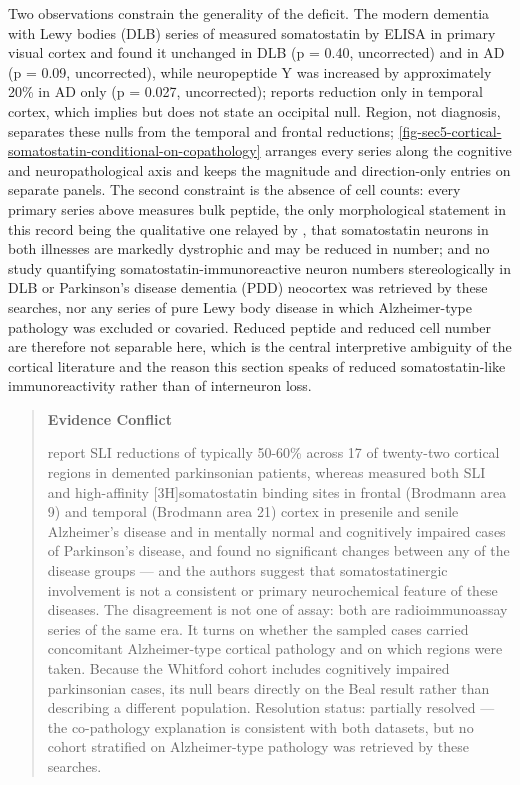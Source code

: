 \documentclass[11pt]{article}
\begin{document}
Two observations constrain the generality of the deficit. The modern dementia with Lewy bodies (DLB) series of \citet{Khundakar2016} measured somatostatin by ELISA in primary visual cortex and found it unchanged in DLB (p = 0.40, uncorrected) and in AD (p = 0.09, uncorrected), while neuropeptide Y was increased by approximately 20\% in AD only (p = 0.027, uncorrected); \citet{Leake1991} reports reduction only in temporal cortex, which implies but does not state an occipital null. Region, not diagnosis, separates these nulls from the temporal and frontal reductions; \ref{fig-sec5-cortical-somatostatin-conditional-on-copathology} arranges every series along the cognitive and neuropathological axis and keeps the magnitude and direction-only entries on separate panels. The second constraint is the absence of cell counts: every primary series above measures bulk peptide, the only morphological statement in this record being the qualitative one relayed by \citet{Beal1990}, that somatostatin neurons in both illnesses are markedly dystrophic and may be reduced in number; and no study quantifying somatostatin-immunoreactive neuron numbers stereologically in DLB or Parkinson's disease dementia (PDD) neocortex was retrieved by these searches, nor any series of pure Lewy body disease in which Alzheimer-type pathology was excluded or covaried. Reduced peptide and reduced cell number are therefore not separable here, which is the central interpretive ambiguity of the cortical literature and the reason this section speaks of reduced somatostatin-like immunoreactivity rather than of interneuron loss.

\begin{quote}
\noindent\textbf{Evidence Conflict}\par
\citet{FlintBeal1988} report SLI reductions of typically 50-60\% across 17 of twenty-two cortical regions in demented parkinsonian patients, whereas \citet{Whitford1988} measured both SLI and high-affinity [3H]somatostatin binding sites in frontal (Brodmann area 9) and temporal (Brodmann area 21) cortex in presenile and senile Alzheimer's disease and in mentally normal and cognitively impaired cases of Parkinson's disease, and found no significant changes between any of the disease groups --- and the authors suggest that somatostatinergic involvement is not a consistent or primary neurochemical feature of these diseases. The disagreement is not one of assay: both are radioimmunoassay series of the same era. It turns on whether the sampled cases carried concomitant Alzheimer-type cortical pathology and on which regions were taken. Because the Whitford cohort includes cognitively impaired parkinsonian cases, its null bears directly on the Beal result rather than describing a different population. Resolution status: partially resolved --- the co-pathology explanation is consistent with both datasets, but no cohort stratified on Alzheimer-type pathology was retrieved by these searches.

\end{quote}
\end{document}
